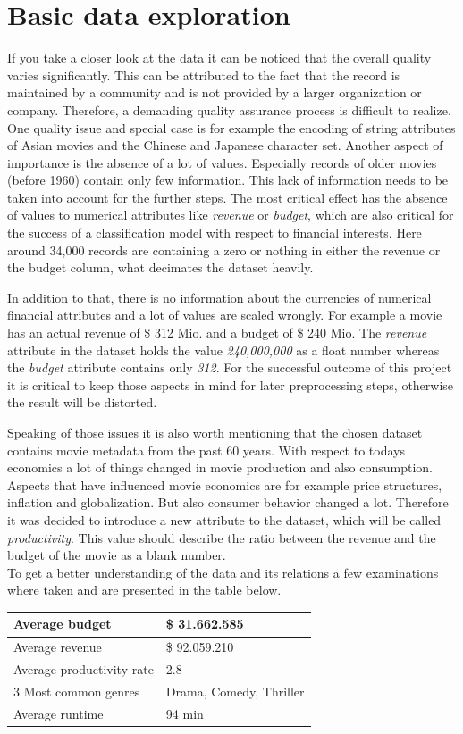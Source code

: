\section{Basic data exploration}
\label{sec:data_exploration}
If you take a closer look at the data it can be noticed that the overall quality varies significantly. This can be attributed to the fact that the record is maintained by a community and is not provided by a larger organization or company. Therefore, a demanding quality assurance process is difficult to realize. One  quality issue and special case is for example the encoding of string attributes of Asian movies and the Chinese and Japanese character set. Another aspect of importance is the absence of a lot of values. Especially records of older movies (before 1960) contain only few information. This lack of information needs to be taken into account for the further steps. The most critical effect has the absence of values to numerical attributes like \textit{revenue} or \textit{budget}, which are also critical for the success of a classification model with respect to financial interests. Here around 34,000 records are containing a zero or nothing in either the revenue or the budget column, what decimates the dataset heavily. 

In addition to that, there is no information about the currencies of numerical financial attributes and a lot of values are scaled wrongly. For example a movie has an actual revenue of \$ 312 Mio. and a budget of \$ 240 Mio. The \textit{revenue} attribute in the dataset holds the value \textit{240,000,000} as a float number whereas the \textit{budget} attribute contains only \textit{312}. For the successful outcome of this project it is critical to keep those aspects in mind for later preprocessing steps, otherwise the result will be distorted. 

Speaking of those issues it is also worth mentioning that the chosen dataset contains movie metadata from the past 60 years. With respect to todays economics a lot of things changed in movie production and also consumption. Aspects that have influenced movie economics are for example price structures, inflation and globalization. But also consumer behavior changed a lot. Therefore it was decided to introduce a new attribute to the dataset, which will be called \textit{productivity}. This value should describe the ratio between the revenue and the budget of the movie as a blank number.
\\

To get a better understanding of the data and its relations a few examinations where taken and are presented in the table below.
\begin{center}
	\begin{tabular}{| l | l |}
	\hline
	Average budget & \$ 31.662.585 \\ \hline
	Average revenue & \$ 92.059.210 \\ \hline
	Average productivity rate & 2.8 \\ \hline
	3 Most common genres & Drama, Comedy, Thriller \\ \hline
	Average runtime & 94 min \\ \hline
	\end{tabular}
\end{center} 